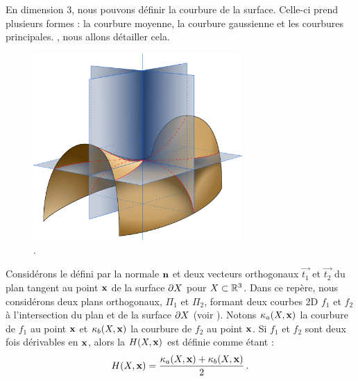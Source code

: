 %     


En dimension 3, nous pouvons définir la courbure de la surface. Celle-ci prend
plusieurs formes : la courbure moyenne, la courbure gaussienne et les courbures
principales. , nous allons détailler cela.

\begin{figure}[ht]{
    \begin{center}
    \includegraphics[width=8cm]{figures/Minimal_surface_curvature_planes-fr}
    \end{center}}
    \caption{
    \cite{WikipediaCurv}.\label{fig:wiki-surv}}
\end{figure}

Considérons le  défini par la normale $\mathbf{n}$ et
deux vecteurs orthogonaux $\vec{t_1}$ et $\vec{t_2}$ du plan tangent au point
$\mathbf{x}$ de la surface $\partial X$ pour $X \subset \mathbb{R}^3$. Dans ce repère, nous
considérons deux plans orthogonaux, $\Pi_1$ et $\Pi_2$, formant deux courbes 2D
$f_1$ et $f_2$ à l'intersection du plan et de la surface $\partial X$ (voir
). Notons $\kappa_{a}(X,\mathbf{x})$ la courbure de $f_1$ au
point $\mathbf{x}$ et $\kappa_{b}(X,\mathbf{x})$ la courbure de $f_2$ au point $\mathbf{x}$. Si
$f_1$ et $f_2$ sont deux fois dérivables en $\mathbf{x}$, alors la  $H(X,\mathbf{x})$ est définie comme étant :
%
\begin{equation}
  H(X,\mathbf{x}) = \frac{\kappa_{a}(X,\mathbf{x}) + \kappa_{b}(X,\mathbf{x})}{2} \,.
\end{equation}


